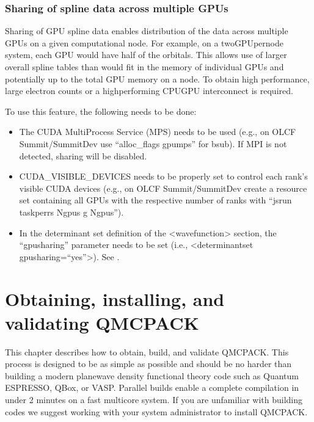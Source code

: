 \documentclass[letterpaper,10pt,english]{sphinxmanual}
\begin{document}
\subsection{Sharing of spline data across multiple GPUs}
\label{\detokenize{features:sharing-of-spline-data-across-multiple-gpus}}
Sharing of GPU spline data enables distribution of the data across
multiple GPUs on a given computational node. For example, on a
two\sphinxhyphen{}GPU\sphinxhyphen{}per\sphinxhyphen{}node system, each GPU would have half of the orbitals. This
allows use of larger overall spline tables than would fit in the memory
of individual GPUs and potentially up to the total GPU memory on a node.
To obtain high performance, large electron counts or a high\sphinxhyphen{}performing
CPU\sphinxhyphen{}GPU interconnect is required.

To use this feature, the following needs to be done:
\begin{itemize}
\item {} 
The CUDA Multi\sphinxhyphen{}Process Service (MPS) needs to be used (e.g., on OLCF
Summit/SummitDev use “\sphinxhyphen{}alloc\_flags gpumps” for bsub). If MPI is not
detected, sharing will be disabled.

\item {} 
CUDA\_VISIBLE\_DEVICES needs to be properly set to control each rank’s
visible CUDA devices (e.g., on OLCF Summit/SummitDev create a
resource set containing all GPUs with the respective number of ranks
with “jsrun \textendash{}task\sphinxhyphen{}per\sphinxhyphen{}rs Ngpus \sphinxhyphen{}g Ngpus”).

\item {} 
In the determinant set definition of the \textless{}wavefunction\textgreater{} section, the
“gpusharing” parameter needs to be set (i.e., \textless{}determinantset
gpusharing=“yes”\textgreater{}). See
{\hyperref[\detokenize{intro_wavefunction:spo-spline}]{}}.

\end{itemize}




\chapter{Obtaining, installing, and validating QMCPACK}
\label{\detokenize{installation:obtaining-installing-and-validating-qmcpack}}\label{\detokenize{installation:obtaininginstalling}}\label{\detokenize{installation::doc}}
This chapter describes how to obtain, build, and validate QMCPACK. This
process is designed to be as simple as possible and should be no harder
than building a modern plane\sphinxhyphen{}wave density functional theory code such as
Quantum ESPRESSO, QBox, or VASP. Parallel builds enable a complete
compilation in under 2 minutes on a fast multicore system. If you are
unfamiliar with building codes we suggest working with your system
administrator to install QMCPACK.
\end{document}
